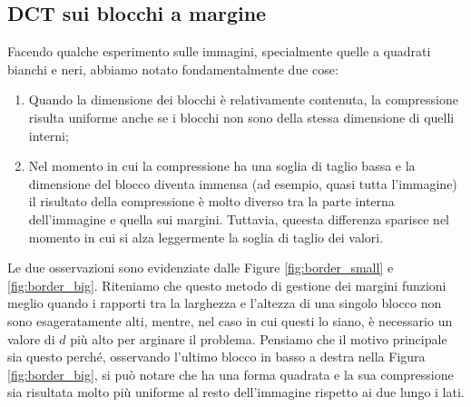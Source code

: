 \subsection{DCT sui blocchi a margine}
Facendo qualche esperimento sulle immagini, specialmente quelle a quadrati bianchi e neri, abbiamo notato fondamentalmente due cose:
\begin{enumerate}
	\item Quando la dimensione dei blocchi è relativamente contenuta, la compressione risulta uniforme anche se i blocchi non sono della stessa dimensione di quelli interni;
	\item Nel momento in cui la compressione ha una soglia di taglio bassa e la dimensione del blocco diventa immensa (ad esempio, quasi tutta l'immagine) il risultato della compressione è molto diverso tra la parte interna dell'immagine e quella sui margini. Tuttavia, queesta differenza sparisce nel momento in cui si alza leggermente la soglia di taglio dei valori.
\end{enumerate}
Le due osservazioni sono evidenziate dalle Figure \ref{fig:border_small} e \ref{fig:border_big}. Riteniamo che questo metodo di gestione dei margini funzioni meglio quando i rapporti tra la larghezza e l'altezza di una singolo blocco non sono esageratamente alti,  mentre, nel caso in cui questi lo siano, è necessario un valore di $d$ più alto per arginare il problema. Pensiamo che il motivo principale sia questo perché, osservando l'ultimo blocco in basso a destra nella Figura \ref{fig:border_big}, si può notare che ha una forma quadrata e la sua compressione sia risultata molto più uniforme al resto dell'immagine rispetto ai due lungo i lati.


